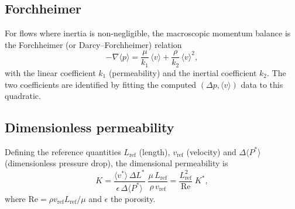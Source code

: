 \documentclass[11pt,a4paper]{article}
\begin{document}
\subsection{Forchheimer}

For flows where inertia is non-negligible, the macroscopic momentum balance is
the Forchheimer (or Darcy--Forchheimer) relation
\begin{equation}
-\nabla\langle p\rangle
=\frac{\mu}{k_{1}}\,\langle v\rangle
 +\frac{\rho}{k_{2}}\,\langle v\rangle^{2} ,
\end{equation}
with the linear coefficient $k_{1}$ (permeability) and the inertial
coefficient $k_{2}$.  The two coefficients are identified by fitting the
computed $(\Delta p,\langle v\rangle)$ data to this quadratic.

\subsection{Dimensionless permeability}

Defining the reference quantities $L_{\text{ref}}$ (length),
$v_{\text{ref}}$ (velocity) and
$\Delta\langle P^{*}\rangle$ (dimensionless pressure drop), the dimensional
permeability is
\begin{equation}
K=\frac{\langle v^{*}\rangle\,\Delta L^{*}}{\epsilon\,\Delta\langle P^{*}\rangle}
   \;\frac{\mu\,L_{\text{ref}}}{\rho\,v_{\text{ref}}}
=\frac{L_{\text{ref}}^{2}}{\mathrm{Re}}\;K^{*} ,
\end{equation}
where $\mathrm{Re}=\rho v_{\text{ref}}L_{\text{ref}}/\mu$ and $\epsilon$ the
porosity.

\end{document}

